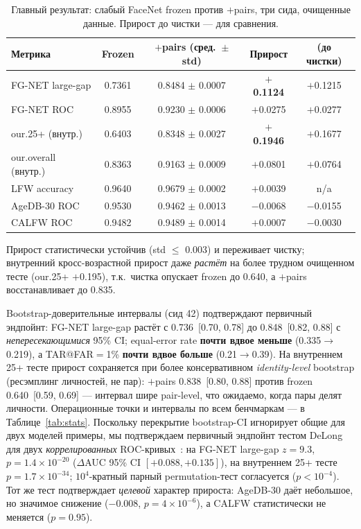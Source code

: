 \documentclass[journal]{IEEEtran}
\begin{document}
\begin{table}[!t]
\renewcommand{\arraystretch}{1.2}
\caption{Главный результат: слабый FaceNet frozen против $+$pairs, три сида, очищенные данные. Прирост до чистки --- для сравнения.}
\label{tab:main}
\centering
\footnotesize
\begin{tabular}{@{}lcccc@{}}
\toprule
Метрика & Frozen & $+$pairs (сред.\ $\pm$ std) & Прирост & (до чистки) \\
\midrule
FG-NET large-gap & 0.7361 & 0.8484 $\pm$ 0.0007 & \textbf{$+$0.1124} & $+$0.1215 \\
FG-NET ROC & 0.8955 & 0.9230 $\pm$ 0.0006 & $+$0.0275 & $+$0.0277 \\
our.25+ (внутр.) & 0.6403 & 0.8348 $\pm$ 0.0027 & \textbf{$+$0.1946} & $+$0.1677 \\
our.overall (внутр.) & 0.8363 & 0.9163 $\pm$ 0.0009 & $+$0.0801 & $+$0.0764 \\
LFW accuracy & 0.9640 & 0.9679 $\pm$ 0.0002 & $+$0.0039 & n/a \\
AgeDB-30 ROC & 0.9530 & 0.9462 $\pm$ 0.0013 & $-$0.0068 & $-$0.0155 \\
CALFW ROC & 0.9482 & 0.9489 $\pm$ 0.0014 & $+$0.0007 & $-$0.0030 \\
\bottomrule
\end{tabular}
\end{table}

Прирост статистически устойчив (std $\leq$ 0.003) и переживает чистку; внутренний кросс-возрастной прирост даже \emph{растёт} на более трудном очищенном тесте (our.25+ $+$0.195), т.к.\ чистка опускает frozen до 0.640, а $+$pairs восстанавливает до 0.835.

Bootstrap-доверительные интервалы (сид 42) подтверждают первичный эндпойнт: FG-NET large-gap растёт с 0.736~[0.70, 0.78] до 0.848~[0.82, 0.88] с \emph{непересекающимися} 95\% CI; equal-error rate \textbf{почти вдвое меньше} (0.335$\to$0.219), а TAR@FAR$=$1\% \textbf{почти вдвое больше} (0.21$\to$0.39). На внутреннем 25+ тесте прирост сохраняется при более консервативном \emph{identity-level} bootstrap (ресэмплинг личностей, не пар): $+$pairs 0.838~[0.80, 0.88] против frozen 0.640~[0.59, 0.69] --- интервал шире pair-level, что ожидаемо, когда пары делят личности. Операционные точки и интервалы по всем бенчмаркам --- в Таблице~\ref{tab:stats}. Поскольку перекрытие bootstrap-CI игнорирует общие для двух моделей примеры, мы подтверждаем первичный эндпойнт тестом DeLong для двух \emph{коррелированных} ROC-кривых~\cite{delong1988}: на FG-NET large-gap $z=9.3$, $p=1.4\times10^{-20}$ ($\Delta$AUC 95\% CI $[+0.088,+0.135]$), на внутреннем 25+ тесте $p=1.7\times10^{-34}$; $10^4$-кратный парный permutation-тест согласуется ($p<10^{-4}$). Тот же тест подтверждает \emph{целевой} характер прироста: AgeDB-30 даёт небольшое, но значимое снижение ($-$0.008, $p=4\times10^{-6}$), а CALFW статистически не меняется ($p=0.95$).
\end{document}
